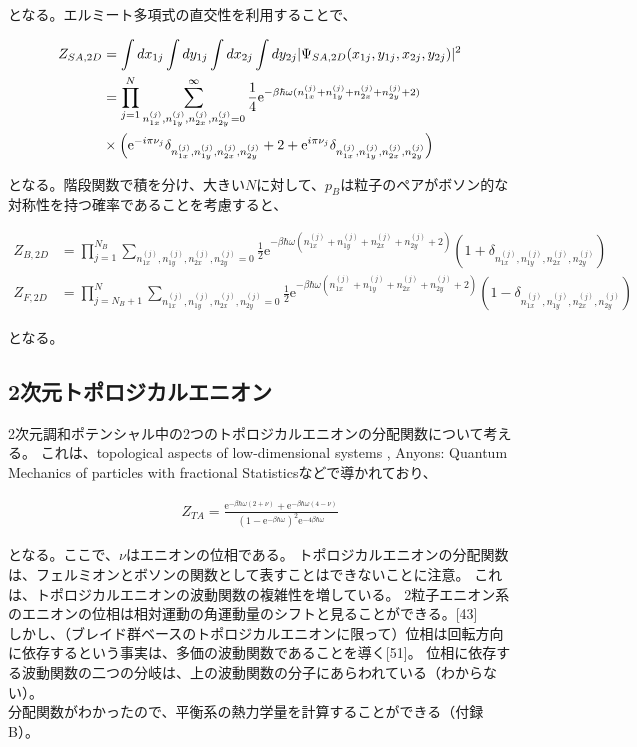 \documentclass[a4paper,11pt]{jsarticle}
\numberwithin{equation}{section}
\begin{document}
となる。エルミート多項式の直交性を利用することで、

\begin{align}
  Z_{SA,2D} &=\int dx_{1j}\int dy_{1j}\int dx_{2j}\int dy_{2j}|\Psi_{SA,2D}(x_{1j},y_{1j},x_{2j},y_{2j})|^2 \\
  &= \prod_{j=1}^N \sum_{n_{1x}^{(j)},n_{1y}^{(j)},n_{2x}^{(j)},n_{2y}^{(j)}=0}^{\infty}\frac{1}{4}\mathrm{e}^{-\beta\hbar\omega(n_{1x}^{(j)}+n_{1y}^{(j)}+n_{2x}^{(j)}+n_{2y}^{(j)}+2)}\notag\\ 
  &\times \left(\mathrm{e}^{-i\pi\nu_j}\delta_{n_{1x}^{(j)},n_{1y}^{(j)},n_{2x}^{(j)},n_{2y}^{(j)}}+2+\mathrm{e}^{i\pi\nu_j}\delta_{n_{1x}^{(j)},n_{1y}^{(j)},n_{2x}^{(j)},n_{2y}^{(j)}}\right)  \notag\\
\end{align}

となる。階段関数で積を分け、大きい$N$に対して、$p_B$は粒子のペアがボソン的な対称性を持つ確率であることを考慮すると、

\begin{align}
  Z_{B,2D}&=\prod_{j=1}^{N_B}\sum_{n_{1x}^{(j)},n_{1y}^{(j)},n_{2x}^{(j)},n_{2y}^{(j)}=0}\frac{1}{2}\mathrm{e}^{-\beta\hbar\omega(n_{1x}^{(j)}+n_{1y}^{(j)}+n_{2x}^{(j)}+n_{2y}^{(j)}+2)}(1+\delta_{n_{1x}^{(j)},n_{1y}^{(j)},n_{2x}^{(j)},n_{2y}^{(j)}})\\
  Z_{F,2D}&= \prod_{j=N_B+1}^{N}\sum_{n_{1x}^{(j)},n_{1y}^{(j)},n_{2x}^{(j)},n_{2y}^{(j)}=0}\frac{1}{2}\mathrm{e}^{-\beta\hbar\omega(n_{1x}^{(j)}+n_{1y}^{(j)}+n_{2x}^{(j)}+n_{2y}^{(j)}+2)}(1-\delta_{n_{1x}^{(j)},n_{1y}^{(j)},n_{2x}^{(j)},n_{2y}^{(j)}})
\end{align}

となる。

\subsection{2次元トポロジカルエニオン}
2次元調和ポテンシャル中の2つのトポロジカルエニオンの分配関数について考える。
これは、topological aspects of low-dimensional systems , Anyons: Quantum Mechanics of particles with fractional Statisticsなどで導かれており、

\begin{align}
Z_{TA}=\frac{\mathrm{e}^{-\beta\hbar\omega(2+\nu)}+\mathrm{e}^{-\beta \hbar \omega (4-\nu)}}{(1-\mathrm{e}^{-\beta\hbar\omega})^2\mathrm{e}^{-4\beta\hbar\omega}}
\end{align}

となる。ここで、$\nu$はエニオンの位相である。
トポロジカルエニオンの分配関数は、フェルミオンとボソンの関数として表すことはできないことに注意。
これは、トポロジカルエニオンの波動関数の複雑性を増している。
2粒子エニオン系のエニオンの位相は相対運動の角運動量のシフトと見ることができる。[43]\\
しかし、（ブレイド群ベースのトポロジカルエニオンに限って）位相は回転方向に依存するという事実は、多価の波動関数であることを導く[51]。
位相に依存する波動関数の二つの分岐は、上の波動関数の分子にあらわれている（わからない）。\\
分配関数がわかったので、平衡系の熱力学量を計算することができる（付録B）。
\end{document}
